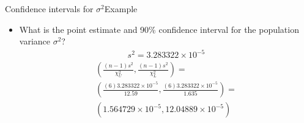 \documentclass[xcolor=dvipsnames]{beamer}
\begin{document}
\begin{frame}{Confidence intervals for $\sigma^2$}{Example}
	\begin{itemize}
		\item What is the point estimate and 90\% confidence interval for the population variance $\sigma^2$?
		\begin{gather*}
		s^2 = 3.283322 \times 10^{-5}
		\end{gather*}
		\begin{gather*}
		\left(\frac{(n-1) s^2}{\chi_U^2}, \frac{(n-1)s^2}{\chi_L^2} \right) = \\
		\left(\frac{(6) 3.283322 \times 10^{-5}}{12.59}, \frac{(6)3.283322 \times 10^{-5}}{1.635} \right) = \\
		(1.564729  \times 10^{-5}, 12.04889  \times 10^{-5})
		\end{gather*}
	\end{itemize}
\end{frame}
\end{document}

